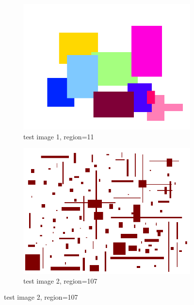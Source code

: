 \documentclass[a4paper, 11pt]{article}
\begin{document}
\begin{figure}[H]
    \centering
    \begin{subfigure}[b]{0.3\textwidth}
        \centering
        \includegraphics[width=\textwidth]{images/origin/1.png}
        \caption{test image 1, region=11}
    \end{subfigure}
    \hspace{5mm}
    \begin{subfigure}[b]{0.3\textwidth}
        \centering
        \includegraphics[width=\textwidth]{images/origin/2.png}
        \caption{test image 2, region=107}
    \end{subfigure}
    

\end{figure}
\end{document}
